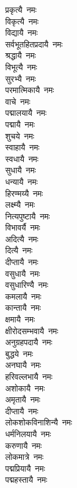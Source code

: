 \begin{multicols}{2}
\begin{flushleft}
प्रकृत्यै~नमः\\
विकृत्यै~नमः\\
विद्यायै~नमः\\
सर्वभूतहितप्रदायै~नमः\\
श्रद्धायै~नमः\\
विभूत्यै~नमः\\
सुरभ्यै~नमः\\
परमात्मिकायै~नमः\\
वाचे~नमः\\
पद्मालयायै~नमः\hfill{}\\
पद्मायै~नमः\\
शुचये~नमः\\
स्वाहायै~नमः\\
स्वधायै~नमः\\
सुधायै~नमः\\
धन्यायै~नमः\\
हिरण्मय्यै~नमः\\
लक्ष्म्यै~नमः\\
नित्यपुष्टायै~नमः\\
विभावर्यै~नमः\hfill{}\\
अदित्यै~नमः\\
दित्यै~नमः\\
दीप्तायै~नमः\\
वसुधायै~नमः\\
वसुधारिण्यै~नमः\\
कमलायै~नमः\\
कान्तायै~नमः\\
क्षमायै~नमः\\
क्षीरोदसम्भवायै~नमः\\
अनुग्रहपदायै~नमः\hfill{}\\
बुद्धये~नमः\\
अनघायै~नमः\\
हरिवल्लभायै~नमः\\
अशोकायै~नमः\\
अमृतायै~नमः\\
दीप्तायै~नमः\\
लोकशोकविनाशिन्यै~नमः\\
धर्मनिलयायै~नमः\\
करुणायै~नमः\\
लोकमात्रे~नमः\hfill{}\\
पद्मप्रियायै~नमः\\
पद्महस्तायै~नमः\\

\end{flushleft}
\end{multicols}
